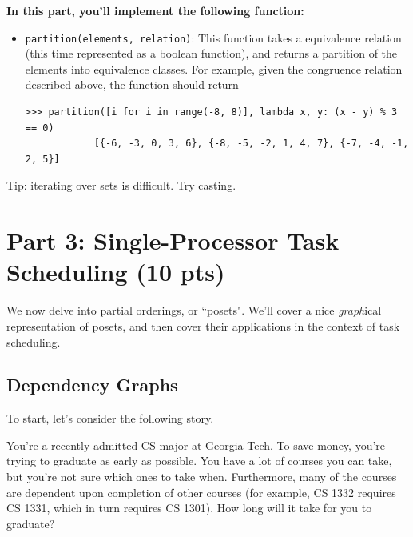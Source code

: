 \documentclass{article}
\begin{document}
    \vspace{3mm}
    \begin{tcolorbox}[colback=yellow!30]
        \textbf{In this part, you'll implement the following function:}
        \begin{itemize}
            \item \lstinline{partition(elements, relation)}: This function takes a equivalence relation (this time represented as a boolean function), and returns a partition of the elements into equivalence classes. For example, given the congruence relation described above, the function should return
        \begin{lstlisting}[belowskip=-10pt]
            >>> partition([i for i in range(-8, 8)], lambda x, y: (x - y) % 3 == 0)
            [{-6, -3, 0, 3, 6}, {-8, -5, -2, 1, 4, 7}, {-7, -4, -1, 2, 5}]
        \end{lstlisting}

        \end{itemize}

        Tip: iterating over sets is difficult. Try casting.
    \end{tcolorbox}


\section*{Part 3: Single-Processor Task Scheduling (10 pts)}

    We now delve into partial orderings, or ``posets". We'll cover a nice \textit{graph}ical representation of posets, and then cover their applications in the context of task scheduling. 
    
    \subsection*{Dependency Graphs}
    
    To start, let's consider the following story. 

    \begin{tcolorbox}[colback=red!20]
        You're a recently admitted CS major at Georgia Tech. To save money, you're trying to graduate as early as possible.  You have a lot of courses you can take, but you're not sure which ones to take when. Furthermore, many of the courses are dependent upon completion of other courses (for example, CS 1332 requires CS 1331, which in turn requires CS 1301). How long will it take for you to graduate?
    \end{tcolorbox}
\end{document}
